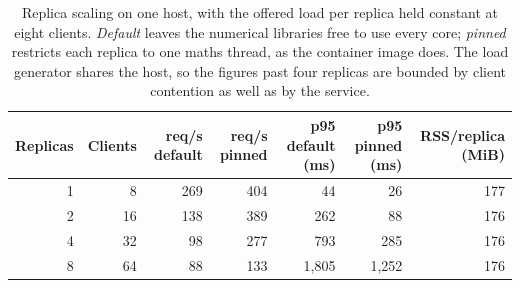 \begin{table}[htbp]
\centering
\caption{Replica scaling on one host, with the offered load per replica held constant at eight clients. \emph{Default} leaves the numerical libraries free to use every core; \emph{pinned} restricts each replica to one maths thread, as the container image does. The load generator shares the host, so the figures past four replicas are bounded by client contention as well as by the service.}
\label{tab:scaling}
\scriptsize
\begin{tabular}{rrrrrrr}
\hline
Replicas & Clients & req/s default & req/s pinned & p95 default (ms) & p95 pinned (ms) & RSS/replica (MiB) \\
\hline
1 & 8 & 269 & 404 & 44 & 26 & 177 \\
2 & 16 & 138 & 389 & 262 & 88 & 176 \\
4 & 32 & 98 & 277 & 793 & 285 & 176 \\
8 & 64 & 88 & 133 & 1,805 & 1,252 & 176 \\
\hline
\end{tabular}
\end{table}
